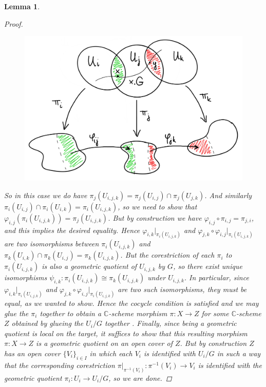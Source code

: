 \documentclass[12pt,a4paper]{amsart}
\theoremstyle{plain}
\newtheorem{lm}[thm]{Lemma}
\theoremstyle{definition}
\theoremstyle{remark}
\begin{document}
\begin{lm}
\begin{proof}
    \begin{figure}[H]
      \centering
      \includegraphics[scale=.9]{pictures/glueing.png}
    \end{figure}

    So in this case we do have $\pi_{j}(U_{i,j,k}) = \pi_{j}(U_{i,j}) \cap \pi_{j}(U_{j,k})$.
    And similarly $\pi_{i}(U_{i,j}) \cap \pi_{i}(U_{i,k}) = \pi_{i}(U_{i,j,k})$, so we need to show that $\varphi_{i,j}(\pi_{i}(U_{i,j,k})) = \pi_{j}(U_{i,j,k})$.
    But by construction we have $\varphi_{i,j} \circ \pi_{i,j} = \pi_{j,i}$, and this implies the desired equality.
    Hence $\varphi_{i,k}|_{\pi_{i}(U_{i,j,k})}$ and $\varphi_{j,k} \circ \varphi_{i,j}|_{\pi_{i}(U_{i,j,k})}$ are two isomorphisms between $\pi_{i}(U_{i,j,k})$ and $\pi_{k}(U_{i,k}) \cap \pi_{k}(U_{i,j}) = \pi_{k}(U_{i,j,k})$.
    But the corestriction of each $\pi_{i}$ to $\pi_{i}(U_{i,j,k})$ is also a geometric quotient of $U_{i,j,k}$ by $G$, so there exist unique isomorphisms $\psi_{i,k} \colon \pi_{i}(U_{i,j,k}) \cong \pi_{k}(U_{i,j,k})$ under $U_{i,j,k}$.
    In particular, since $\varphi_{i,k}|_{\pi_{i}(U_{i,j,k})}$ and $\varphi_{j,k} \circ \varphi_{i,j}|_{\pi_{i}(U_{i,j,k})}$ are two such isomorphisms, they must be equal, as we wanted to show.
    Hence the cocycle condition is satisfied and we may glue the $\pi_{i}$ together to obtain a $\mathbb{C}$-scheme morphism $\pi \colon X \to Z$ for some $\mathbb{C}$-scheme $Z$ obtained by glueing the $U_{i}/G$ together \cite[Exercise II.2.12]{har77}.
    Finally, since being a geometric quotient is local on the target, it suffices to show that this resulting morphism $\pi \colon X \to Z$ is a geometric quotient on an open cover of $Z$.
    But by construction $Z$ has an open cover $\{ V_{i} \}_{i \in I}$ in which each $V_{i}$ is identified with $U_{i}/G$ in such a way that the corresponding corestriction $\pi|_{\pi^{-1}(V_{i})} \colon \pi^{-1}(V_{i}) \to V_{i}$ is identified with the geometric quotient $\pi_{i} \colon U_{i} \to U_{i}/G$, so we are done.
  \end{proof}
\end{lm}



\vfill
\end{document}
